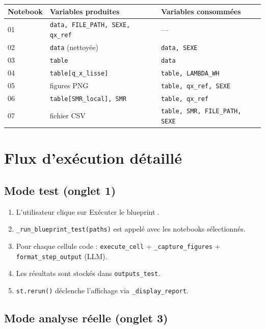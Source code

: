 \documentclass[11pt,a4paper]{article}
\begin{document}
\begin{center}
\begin{tabular}{lll}
\toprule
\textbf{Notebook} & \textbf{Variables produites} & \textbf{Variables consommées} \\
\midrule
01 & \texttt{data, FILE\_PATH, SEXE, qx\_ref} & — \\
02 & \texttt{data} (nettoyée) & \texttt{data, SEXE} \\
03 & \texttt{table} & \texttt{data} \\
04 & \texttt{table[q\_x\_lisse]} & \texttt{table, LAMBDA\_WH} \\
05 & figures PNG & \texttt{table, qx\_ref, SEXE} \\
06 & \texttt{table[SMR\_local], SMR} & \texttt{table, qx\_ref} \\
07 & fichier CSV & \texttt{table, SMR, FILE\_PATH, SEXE} \\
\bottomrule
\end{tabular}
\end{center}

\section{Flux d'exécution détaillé}

\subsection{Mode test (onglet 1)}

\begin{enumerate}
  \item L'utilisateur clique sur \og Exécuter le blueprint \fg{}.
  \item \texttt{\_run\_blueprint\_test(paths)} est appelé avec les notebooks sélectionnés.
  \item Pour chaque cellule code : \texttt{execute\_cell} + \texttt{\_capture\_figures}
        + \texttt{format\_step\_output} (LLM).
  \item Les résultats sont stockés dans \texttt{outputs\_test}.
  \item \texttt{st.rerun()} déclenche l'affichage via \texttt{\_display\_report}.
\end{enumerate}

\subsection{Mode analyse réelle (onglet 3)}
\end{document}
